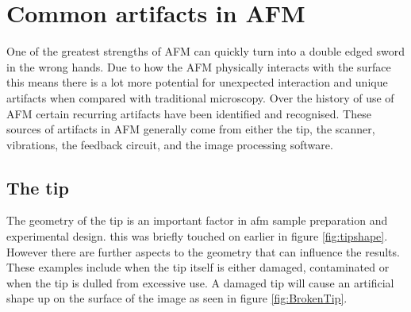 




\section{Common artifacts in AFM}
\label{chap:commonArtifacts}

One of the greatest strengths of AFM can quickly turn into a double edged sword in the wrong hands. Due to how the AFM physically interacts with the surface this means there is a lot more potential for unexpected interaction and unique artifacts when compared with traditional microscopy. Over the history of use of AFM certain recurring artifacts have been identified and recognised. These sources of artifacts in AFM generally come from either the tip, the scanner, vibrations, the feedback circuit, and the image processing software. 

\subsection{The tip}

The geometry of the tip is an important factor in afm sample preparation and experimental design. this was briefly touched on earlier in figure \ref{fig:tipshape}. However there are further aspects to the geometry that can influence the results. These examples include when the tip itself is either damaged, contaminated or when the tip is dulled from excessive use. A damaged tip will cause an artificial shape up on the surface of the image as seen in figure \ref{fig:BrokenTip}. 

